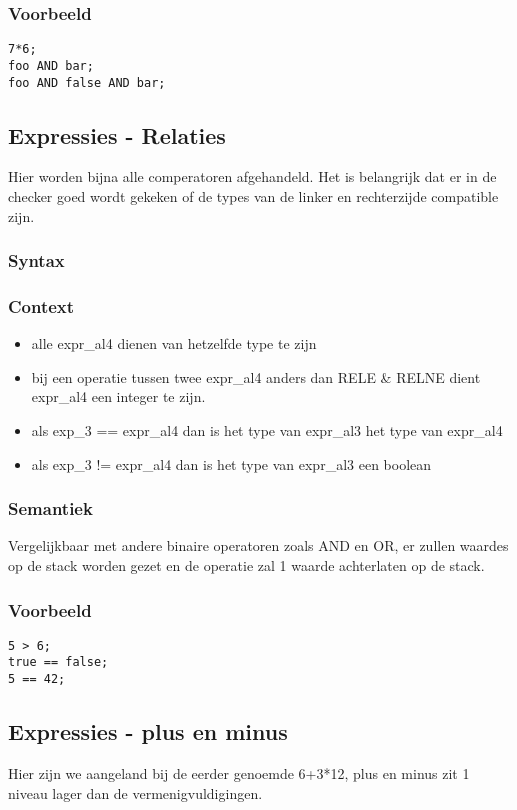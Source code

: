 \documentclass[]{article}
\begin{document}
\subsubsection{Voorbeeld}
\begin{lstlisting}[style=SELMA]
7*6;
foo AND bar;
foo AND false AND bar;
\end{lstlisting}

\subsection{Expressies - Relaties}
Hier worden bijna alle comperatoren afgehandeld. Het is belangrijk dat er in de checker goed wordt gekeken of de types van de linker en rechterzijde compatible zijn.
\subsubsection{Syntax}

\subsubsection{Context}
\begin{itemize}
\item alle expr\_al4 dienen van hetzelfde type te zijn
\item bij een operatie tussen twee expr\_al4 anders dan RELE \& RELNE dient expr\_al4 een integer te zijn.
\item als exp\_3 == expr\_al4 dan is het type van expr\_al3 het type van expr\_al4
\item als exp\_3 != expr\_al4 dan is het type van expr\_al3 een boolean
\end{itemize}
\subsubsection{Semantiek}
Vergelijkbaar met andere binaire operatoren zoals AND en OR, er zullen waardes op de stack worden gezet en de operatie zal 1 waarde achterlaten op de stack.
\subsubsection{Voorbeeld}
\begin{lstlisting}[style=SELMA]
5 > 6;
true == false;
5 == 42;
\end{lstlisting}

\subsection{Expressies - plus en minus}
Hier zijn we aangeland bij de eerder genoemde 6+3*12, plus en minus zit 1 niveau lager dan de vermenigvuldigingen.
\end{document}
